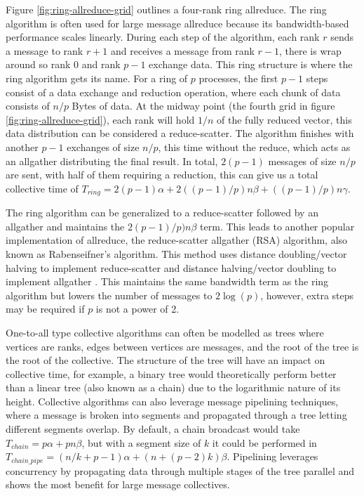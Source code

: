 
Figure \ref{fig:ring-allreduce-grid} outlines a four-rank ring allreduce.
The ring algorithm is often used for large message allreduce because its bandwidth-based performance scales linearly.
During each step of the algorithm, each rank $r$ sends a message to rank $r+1$ and receives a message from rank $r-1$, there is wrap around so rank 0 and rank $p-1$ exchange data.
This ring structure is where the ring algorithm gets its name.
For a ring of $p$ processes, the first $p-1$ steps consist of a data exchange and reduction operation, where each chunk of data consists of $n/p$ Bytes of data. 
At the midway point (the fourth grid in figure \ref{fig:ring-allreduce-grid}), each rank will hold $1/n$ of the fully reduced vector, this data distribution can be considered a reduce-scatter.
The algorithm finishes with another $p-1$ exchanges of size $n/p$, this time without the reduce, which acts as an allgather distributing the final result.
In total, $2(p-1)$ messages of size $n/p$ are sent, with half of them requiring a reduction, this can give us a total collective time of $T_{ring} = 2(p-1)\alpha + 2((p-1)/p)n\beta + ((p-1)/p)n\gamma$.

The ring algorithm can be generalized to a reduce-scatter followed by an allgather and maintains the $2(p-1)/p)n\beta$ term.
This leads to another popular implementation of allreduce, the reduce-scatter allgather (RSA) algorithm, also known as Rabenseifner's algorithm.
This method uses distance doubling/vector halving to implement reduce-scatter and distance halving/vector doubling to implement allgather \cite{Rabenseifner2004OptOfCollRedOps}.
This maintains the same bandwidth term as the ring algorithm but lowers the number of messages to $2\log(p)$, however, extra steps may be required if $p$ is not a power of 2.

One-to-all type collective algorithms can often be modelled as trees where vertices are ranks, edges between vertices are messages, and the root of the tree is the root of the collective.
The structure of the tree will have an impact on collective time, for example, a binary tree would theoretically perform better than a linear tree (also known as a chain) due to the logarithmic nature of its height.
Collective algorithms can also leverage message pipelining techniques, where a message is broken into segments and propagated through a tree letting different segments overlap.
By default, a chain broadcast would take $T_{chain}=p\alpha+pn\beta$, but with a segment size of $k$ it could be performed in $T_{chain\_pipe}=(n/k+p-1)\alpha+(n+(p-2)k)\beta$.
Pipelining leverages concurrency by propagating data through multiple stages of the tree parallel and shows the most benefit for large message collectives.

